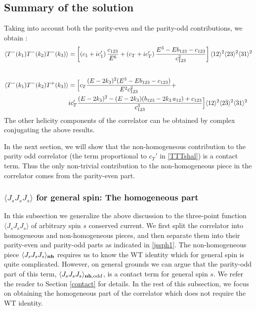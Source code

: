 \documentclass[a4paper,11pt]{article}
\begin{document}
\subsection*{Summary of the solution}
Taking into account both the parity-even and the parity-odd contributions, we obtain :
\begin{align}
\label{TTTshal}
\langle T^-(k_1) T^-(k_2)T^-(k_3) \rangle&=\left[\left(c_1+i c_1'\right) \frac{c_{123}}{E^6}+\left( c_T+ i c_T'\right)\frac{E^3-E b_{123}-c_{123}}{c_{123}^2}\right] \langle 12 \rangle^2 \langle 23 \rangle^2 \langle 31 \rangle^2\notag\\[5 pt]\\
\langle T^-(k_1) T^-(k_2)T^+(k_3) \rangle &=\Big[c_T \frac{(E-2k_3)^2(E^3-E b_{123}-c_{123})}{E^2 c_{123}^2} + \notag\\
&i c_T' \frac{(E-2k_3)^2-(E-2k_3)(b_{123}-2k_3\,a_{12})+c_{123}}{c_{123}^3}\Big]\langle 12 \rangle^2 \langle 2\bar{3} \rangle^2 \langle \bar{3}1 \rangle^2 
\end{align} 
The other helicity components of the correlator can be obtained by complex conjugating the above results.

In the next section, we will show that the non-homogeneous contribution to the parity odd correlator (the term proportional to $c_T'$ in \eqref{TTTshal}) is a contact term. Thus the only non-trivial contribution to the non-homogeneous piece in the correlator comes from the parity-even part.



\subsubsection{$\langle J_s J_s J_s \rangle$ for general spin: The homogeneous part}
In this subsection we generalize the above discussion to the three-point function $\langle J_s J_s J_s \rangle$ of arbitrary spin $s$ conserved current. We first split the correlator into homogeneous and non-homogeneous pieces, and then separate them into their parity-even and parity-odd parts as indicated in \eqref{jssph1}. The non-homogeneous piece $\langle J_s J_s J_s \rangle_{\bf{nh}}$ requires us to know the WT identity which for general spin is quite complicated. However, on general grounds we can argue that the parity-odd part of this term, $\langle J_s J_s J_s \rangle_{\bf{nh},\text{odd}}$, is a contact term for general spin $s$. We refer the reader to Section \ref{contact} for details. In the rest of this subsection, we focus on obtaining the homogeneous part of the correlator which does not require the WT identity.
 
\end{document}
